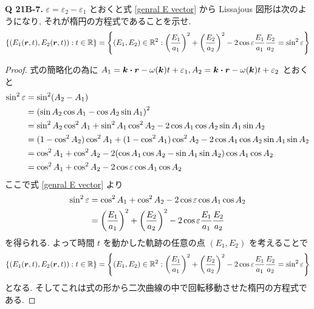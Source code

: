 \documentclass[a4paper,dvipdfmx]{jsarticle}
\theoremstyle{definition}
\begin{document}
\textbf{Q 21B-7.} $\varepsilon = \varepsilon_2 - \varepsilon_1$ とおくと式 \eqref{genral E vector} から Lissajous 図形は次のようになり, それが楕円の方程式であることを示せ.
\begin{align}
  \qty{(E_1(\vb*{r}, t), E_2(\vb*{r}, t)):t\in\mathbb{R}} = \qty{(E_1, E_2)\in\mathbb{R}^2:\qty(\frac{E_1}{a_1})^2 + \qty(\frac{E_2}{a_2})^2 - 2\cos\varepsilon\frac{E_1}{a_1}\frac{E_2}{a_2} = \sin^2{\varepsilon}}
\end{align}
\begin{proof}
  式の簡略化の為に $A_1 = \kk\vdot\rr - \omega(\kk)t + \varepsilon_1, A_2 = \kk\vdot\rr - \omega(\kk)t + \varepsilon_2$ とおくと
  \begin{align}
    \sin^2\varepsilon & = \sin^2(A_2 - A_1)                                                                                   \\
                      & = \qty(\sin{A_2}\cos{A_1} - \cos{A_2}\sin{A_1})^2                                                     \\
                      & = \sin^2{A_2}\cos^2{A_1} + \sin^2{A_1}\cos^2{A_2} - 2\cos{A_1}\cos{A_2}\sin{A_1}\sin{A_2}             \\
                      & = (1 - \cos^2{A_2})\cos^2{A_1} + (1 - \cos^2{A_1})\cos^2{A_2} - 2\cos{A_1}\cos{A_2}\sin{A_1}\sin{A_2} \\
                      & = \cos^2{A_1} + \cos^2{A_2} - 2\qty(\cos{A_1}\cos{A_2} - \sin{A_1}\sin{A_2})\cos{A_1}\cos{A_2}        \\
                      & = \cos^2{A_1} + \cos^2{A_2} - 2\cos\varepsilon\cos{A_1}\cos{A_2}
  \end{align}
  ここで式 \eqref{genral E vector} より
  \begin{align}
    \sin^2\varepsilon & = \cos^2{A_1} + \cos^2{A_2} - 2\cos\varepsilon\cos{A_1}\cos{A_2}                                     \\
                      & = \qty(\frac{E_1}{a_1})^2 + \qty(\frac{E_2}{a_2})^2 - 2\cos\varepsilon\frac{E_1}{a_1}\frac{E_2}{a_2}
  \end{align}
  を得られる. よって時間 $t$ を動かした軌跡の任意の点 $(E_1, E_2)$ を考えることで
  \begin{align}
    \qty{(E_1(\vb*{r}, t), E_2(\vb*{r}, t)):t\in\mathbb{R}} = \qty{(E_1, E_2)\in\mathbb{R}^2:\qty(\frac{E_1}{a_1})^2 + \qty(\frac{E_2}{a_2})^2 - 2\cos\varepsilon\frac{E_1}{a_1}\frac{E_2}{a_2} = \sin^2{\varepsilon}}
  \end{align}
  となる. そしてこれは式の形から二次曲線の中で回転移動させた楕円の方程式である.
\end{proof}
\end{document}

